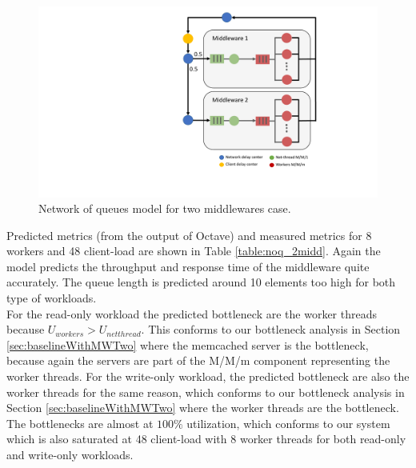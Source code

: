 \begin{figure}[!ht]
    \centering
	\includegraphics[scale=0.6]{figures/6_NoQ/NoQ_figure_two_mws.pdf}
	\caption{Network of queues model for two middlewares case.}
	\label{NoQ_two_mws}
\end{figure}

Predicted metrics (from the output of Octave) and measured metrics for 8 workers and 48 client-load are shown in Table \ref{table:noq_2midd}. 
Again the model predicts the throughput and response time of the middleware quite accurately. The queue length is predicted around 10 elements too high for both type of workloads. \\
For the read-only workload the predicted bottleneck are the worker threads because $U_{workers} > U_{netthread}$. This conforms to our bottleneck analysis in Section \ref{sec:baselineWithMWTwo} where the memcached server is the bottleneck, because again the servers are part of the M/M/m component representing the worker threads. 
For the write-only workload, the predicted bottleneck are also the worker threads for the same reason, which conforms to our bottleneck analysis in Section \ref{sec:baselineWithMWTwo} where the worker threads are the bottleneck. The bottlenecks are almost at $100\%$ utilization, which conforms to our system which is also saturated at 48 client-load with 8 worker threads for both read-only and write-only workloads.\\

